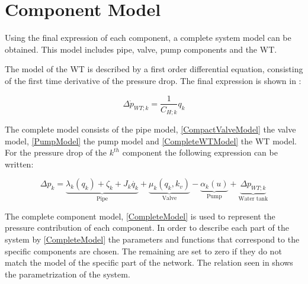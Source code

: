 \section{Component Model} 
\label{CompleteSystemModel}

Using the final expression of each component, a complete system model can be obtained. This model includes pipe, valve, pump components and the WT. 

The model of the WT is described by a first order differential equation, consisting of the first time derivative of the pressure drop. The final expression is shown in :

\begin{equation}
  \label{CompleteWTModel}
  \Delta \dot{p}_{WT;k} = \frac{1}{C_{H;k}} q_k 
\end{equation}

The complete model consists of the pipe model, \eqref{CompactValveModel} the valve model, \eqref{PumpModel} the pump model and \eqref{CompleteWTModel} the WT model. For the pressure drop of the $k^{th}$ component the following expression can be written: 

%

\begin{equation}
\label{CompleteModel}
\Delta p_k = \underbrace{\lambda_k (q_k) + \zeta_k + J_k \dot{q_k}}_\text{Pipe} + \underbrace{\mu_k (q_k, k_v)}_\text{Valve} - \underbrace{\alpha_k(u)}_\text{Pump} + \underbrace{\Delta p_{WT;k}}_\text{Water tank}
\end{equation}

The complete component model, \eqref{CompleteModel} is used to represent the pressure contribution of each component. In order to describe each part of the system by \eqref{CompleteModel} the parameters and functions that correspond to the specific components are chosen. The remaining are set to zero if they do not match the model of the specific part of the network. 
The relation seen in  shows the parametrization of the system.

